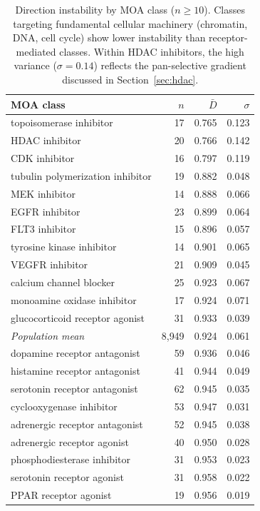 \documentclass{article}
\begin{document}
\begin{table}[t]
\centering
\caption{Direction instability by MOA class ($n \geq 10$). Classes targeting
fundamental cellular machinery (chromatin, DNA, cell cycle) show lower
instability than receptor-mediated classes. Within HDAC inhibitors, the
high variance ($\sigma = 0.14$) reflects the pan-selective gradient
discussed in Section~\ref{sec:hdac}.}
\label{tab:moa}
\small
\begin{tabular}{lrrr}
\toprule
MOA class & $n$ & $\bar{D}$ & $\sigma$ \\
\midrule
topoisomerase inhibitor & 17 & 0.765 & 0.123 \\
HDAC inhibitor & 20 & 0.766 & 0.142 \\
CDK inhibitor & 16 & 0.797 & 0.119 \\
tubulin polymerization inhibitor & 19 & 0.882 & 0.048 \\
MEK inhibitor & 14 & 0.888 & 0.066 \\
EGFR inhibitor & 23 & 0.899 & 0.064 \\
FLT3 inhibitor & 15 & 0.896 & 0.057 \\
tyrosine kinase inhibitor & 14 & 0.901 & 0.065 \\
VEGFR inhibitor & 21 & 0.909 & 0.045 \\
calcium channel blocker & 25 & 0.923 & 0.067 \\
monoamine oxidase inhibitor & 17 & 0.924 & 0.071 \\
glucocorticoid receptor agonist & 31 & 0.933 & 0.039 \\
\midrule
\emph{Population mean} & 8{,}949 & 0.924 & 0.061 \\
\midrule
dopamine receptor antagonist & 59 & 0.936 & 0.046 \\
histamine receptor antagonist & 41 & 0.944 & 0.049 \\
serotonin receptor antagonist & 62 & 0.945 & 0.035 \\
cyclooxygenase inhibitor & 53 & 0.947 & 0.031 \\
adrenergic receptor antagonist & 52 & 0.945 & 0.038 \\
adrenergic receptor agonist & 40 & 0.950 & 0.028 \\
phosphodiesterase inhibitor & 31 & 0.953 & 0.023 \\
serotonin receptor agonist & 31 & 0.958 & 0.022 \\
PPAR receptor agonist & 19 & 0.956 & 0.019 \\
\bottomrule
\end{tabular}
\end{table}
\end{document}
